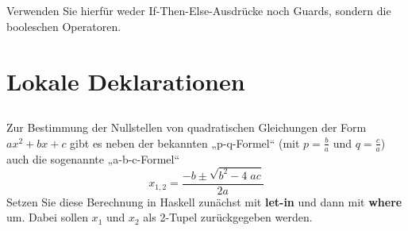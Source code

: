 \documentclass[
  10pt,                   %
  DIV12,
  german,                 %
  oneside,                %
  parskip=half,           %
  headings=normal,        %
  captions=tableheading,  %
]{scrartcl}
\begin{document}
\subsection{}
Verwenden Sie hierfür weder If-Then-Else-Ausdrücke noch Guards, sondern die
booleschen Operatoren.
\section{Lokale Deklarationen}
\subsection{}
Zur Bestimmung der Nullstellen von quadratischen Gleichungen
der Form $ax^2 + bx + c$ gibt es neben der bekannten „p-q-Formel“ 
(mit $p = \frac{b}{a}$ und $q = \frac{c}{a}$) auch die sogenannte „a-b-c-Formel“
\begin{displaymath}
x_{1, 2} = \frac{-b \pm \sqrt{b^2 - 4\;ac}}{2a}
\end{displaymath}
Setzen Sie diese Berechnung in Haskell zunächst mit \textbf{let-in} und dann mit \textbf{where} um.
Dabei sollen $x_1$ und $x_2$ als 2-Tupel zurückgegeben werden.
\end{document}
